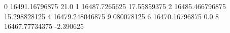 0 16491.16796875 21.0
1 16487.7265625 17.55859375
2 16485.466796875 15.298828125
4 16479.248046875 9.080078125
6 16470.16796875 0.0
8 16467.77734375 -2.390625
